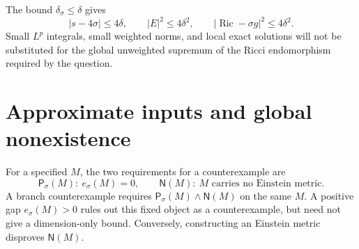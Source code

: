 \documentclass[a4paper,11pt]{article}
\numberwithin{equation}{section}
\theoremstyle{definition}
\newcommand{\Ric}{\operatorname{Ric}}
\begin{document}
The bound $\delta_\sigma\le\delta$ gives
\begin{equation}
 |s-4\sigma|\le4\delta,\qquad |E|^2\le4\delta^2,\qquad
 |\Ric-\sigma g|^2\le4\delta^2.
\end{equation}
Small $L^p$ integrals, small weighted norms, and local exact solutions will not be substituted for the global unweighted supremum of the Ricci endomorphism required by the question.

\section{Approximate inputs and global nonexistence}\label{sec:smooth-object-judgement}
For a specified $M$, the two requirements for a counterexample are
\[
\mathsf P_\sigma(M):\ e_\sigma(M)=0,
\qquad
\mathsf N(M):\ M\text{ carries no Einstein metric}.
\]
A branch counterexample requires $\mathsf P_\sigma(M)\land\mathsf N(M)$ on the same $M$.
A positive gap $e_\sigma(M)>0$ rules out this fixed object as a counterexample, but need not give a dimension-only bound.
Conversely, constructing an Einstein metric disproves $\mathsf N(M)$.
\end{document}
